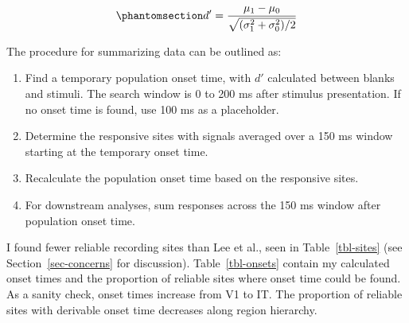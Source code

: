 \documentclass[
  11pt,
  letterpaper,
  DIV=11,
  numbers=noendperiod]{scrartcl}
\providecommand{\tightlist}{%
  \setlength{\itemsep}{0pt}\setlength{\parskip}{0pt}}
\begin{document}
\begin{equation}\phantomsection\label{eq-dprime}{
d' = \frac{\mu_1 - \mu_0}{\sqrt{(\sigma^2_1 + \sigma^2_0)/2}}
}\end{equation}

The procedure for summarizing data can be outlined as:

\begin{enumerate}
\def\labelenumi{\arabic{enumi}.}
\tightlist
\item
  Find a temporary population onset time, with \(d'\) calculated between
  blanks and stimuli. The search window is 0 to 200 ms after stimulus
  presentation. If no onset time is found, use 100 ms as a placeholder.
\item
  Determine the responsive sites with signals averaged over a 150 ms
  window starting at the temporary onset time.
\item
  Recalculate the population onset time based on the responsive sites.
\item
  For downstream analyses, sum responses across the 150 ms window after
  population onset time.
\end{enumerate}

I found fewer reliable recording sites than Lee et al., seen in
Table~\ref{tbl-sites} (see Section~\ref{sec-concerns} for discussion).
Table~\ref{tbl-onsets} contain my calculated onset times and the
proportion of reliable sites where onset time could be found. As a
sanity check, onset times increase from V1 to IT. The proportion of
reliable sites with derivable onset time decreases along region
hierarchy.
\end{document}
